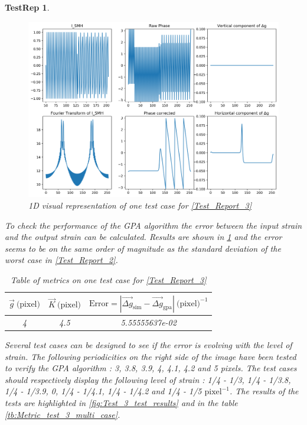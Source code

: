 \documentclass[12pt, titlepage]{article}
\newtheorem{TestRep}{TestRep}
\begin{document}
\begin{TestRep}
\begin{figure}[H]
\begin{center}
\includegraphics[scale=0.5]{Figures/Test_3_explanation_1D.png}
\caption{1D visual representation of one test case for \cref{Test_Report_3}}
\label{fig:Test_3_explanation_1D}
\end{center}
\end{figure}

To check the performance of the GPA algorithm the error between the input strain 
and the output strain can be calculated. Results are shown in 
\cref{tb:Metric_test_3_single_case} and the error seems to be on the same order 
of magnitude as the standard deviation of the worst case in 
\cref{Test_Report_2}.

\begin{table}[H]
\centering
\begin{tabular}{|c|c|c|}
\hline
$\overrightarrow{g} \ \text{(pixel)}$ & $\overrightarrow{K} \ \text{(pixel)}$ & 
$\text{Error}=|\overrightarrow{\Delta g}_{\text{sim}}-\overrightarrow{\Delta 
g}_{\text{gpa}}| \ \text{(pixel)}^{-1}$ \\
\hline
4 & 4.5 & 5.55555637e-02 \\ \hline
\end{tabular}
\caption{Table of metrics on one test case for \cref{Test_Report_3} 
}\label{tb:Metric_test_3_single_case}
\end{table}

Several test cases can be designed to see if the error is evolving with the 
level of strain. The following periodicities on the right side of the image have 
been tested to verify the GPA algorithm : 3, 3.8, 3.9, 4, 4.1, 4.2 and 5 pixels. 
The test cases should respectively display the following level of strain : 1/4 - 
1/3, 1/4 - 1/3.8, 1/4 - 1/3.9, 0, 1/4 - 1/4.1, 1/4 - 1/4.2 and 1/4 - 1/5 
$\text{pixel}^{-1}$. The results of the tests are highlighted in 
\cref{fig:Test_3_test_results} and in the table 
\cref{tb:Metric_test_3_multi_case}. 


\end{TestRep}
\end{document}
